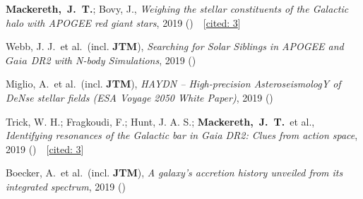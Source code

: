 \item[{\scriptsize5}]\textbf{Mackereth,~J.~T.}; Bovy, J., \textit{Weighing the stellar constituents of the Galactic halo with APOGEE red giant stars}, 2019 ()~~{\footnotesize[\href{http://adsabs.harvard.edu/abs/2019arXiv191003590M}{cited: 3}]}

\item[{\scriptsize4}]Webb, J. J.~et al.~(incl. \textbf{JTM}), \textit{Searching for Solar Siblings in APOGEE and $Gaia$ DR2 with N-body Simulations}, 2019 ()

\item[{\scriptsize3}]Miglio, A.~et al.~(incl. \textbf{JTM}), \textit{HAYDN -- High-precision AsteroseismologY of DeNse stellar fields (ESA Voyage 2050 White Paper)}, 2019 ()

\item[{\scriptsize2}]Trick, W. H.; Fragkoudi, F.; Hunt, J. A. S.; \textbf{Mackereth,~J.~T.}~et al., \textit{Identifying resonances of the Galactic bar in Gaia DR2: Clues from action space}, 2019 ()~~{\footnotesize[\href{http://adsabs.harvard.edu/abs/2019arXiv190604786T}{cited: 3}]}

\item[{\scriptsize1}]Boecker, A.~et al.~(incl. \textbf{JTM}), \textit{A galaxy's accretion history unveiled from its integrated spectrum}, 2019 ()